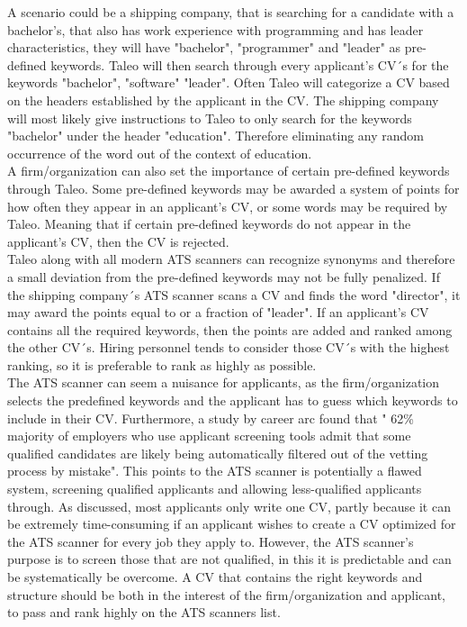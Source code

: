 A scenario could be a shipping company, that is searching for a candidate with a bachelor's, that also has work experience with programming and has leader characteristics, they will have "bachelor", "programmer" and "leader" as pre-defined keywords.
Taleo will then search through every applicant's CV´s for the keywords "bachelor", "software" "leader".\cite{ATS_Purpose_Workings}
Often Taleo will categorize a CV based on the headers established by the applicant in the CV.
The shipping company will most likely give instructions to Taleo to only search for the keywords "bachelor" under the header "education".
Therefore eliminating any random occurrence of the word out of the context of education. \\

A firm/organization can also set the importance of certain pre-defined keywords through Taleo.
Some pre-defined keywords may be awarded a system of points for how often they appear in an applicant's CV, or some words may be required by Taleo.
Meaning that if certain pre-defined keywords do not appear in the applicant's CV, then the CV is rejected. \\

Taleo along with all modern ATS scanners can recognize synonyms and therefore a small deviation from the pre-defined keywords may not be fully penalized.
If the shipping company´s ATS scanner scans a CV and finds the word "director", it may award the points equal to or a fraction of "leader".
If an applicant's CV contains all the required keywords, then the points are added and ranked among the other CV´s.
Hiring personnel tends to consider those CV´s with the highest ranking, so it is preferable to rank as highly as possible. \\

The ATS scanner can seem a nuisance for applicants, as the firm/organization selects the predefined keywords and the applicant has to guess which keywords to include in their CV.
Furthermore, a study by career arc found that " 62\% majority of employers who use applicant screening tools admit that some qualified candidates are likely being automatically filtered out of the vetting process by mistake".\cite{CV_ATS_Broken_System}
This points to the ATS scanner is potentially a flawed system, screening qualified applicants and allowing less-qualified applicants through.
As discussed, most applicants only write one CV, partly because it can be extremely time-consuming if an applicant wishes to create a CV optimized for the ATS scanner for every job they apply to.
However, the ATS scanner's purpose is to screen those that are not qualified, in this it is predictable and can be systematically be overcome.
A CV that contains the right keywords and structure should be both in the interest of the firm/organization and applicant, to pass and rank highly on the ATS scanners list. \\

